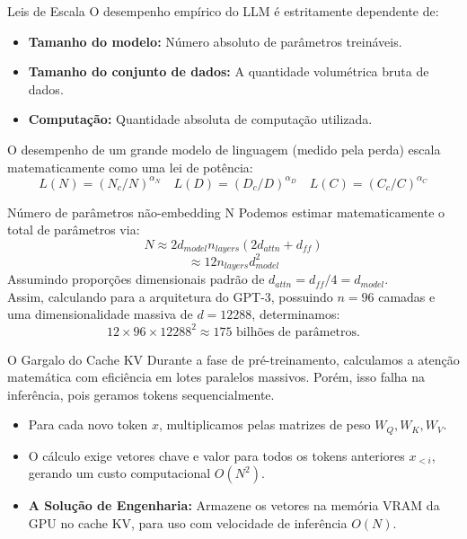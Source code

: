 \documentclass[aspectratio=169]{beamer}
\begin{document}
\begin{frame}{Leis de Escala}\justifying
    O desempenho empírico do LLM é estritamente dependente de:
    \begin{itemize}
        \item \textbf{Tamanho do modelo:} Número absoluto de parâmetros treináveis.
        \item \textbf{Tamanho do conjunto de dados:} A quantidade volumétrica bruta de dados.
        \item \textbf{Computação:} Quantidade absoluta de computação utilizada.
    \end{itemize}
    O desempenho de um grande modelo de linguagem (medido pela perda) escala matematicamente como uma lei de potência:
    \[ L(N) = (N_c/N)^{\alpha_N} \quad L(D) = (D_c/D)^{\alpha_D} \quad L(C) = (C_c/C)^{\alpha_C} \]
\end{frame}

\begin{frame}{Número de parâmetros não-embedding N}\justifying
    Podemos estimar matematicamente o total de parâmetros via:
    \[ N \approx 2 d_{model} n_{layers} (2d_{attn} + d_{ff}) \]   
    \[ \approx 12 n_{layers} d_{model}^2 \]
    Assumindo proporções dimensionais padrão de $d_{attn} = d_{ff}/4 = d_{model}$. \\
    \vspace{0.5cm}
    Assim, calculando para a arquitetura do GPT-3, possuindo $n=96$ camadas e uma dimensionalidade massiva de $d=12288$, determinamos:
    \[ 12 \times 96 \times 12288^2 \approx 175 \text{ bilhões de parâmetros.} \]
\end{frame}

\begin{frame}{O Gargalo do Cache KV}\justifying
    Durante a fase de pré-treinamento, calculamos a atenção matemática com eficiência em lotes paralelos massivos. Porém, isso falha na inferência, pois geramos tokens sequencialmente.
    \begin{itemize}
        \item Para cada novo token $x$, multiplicamos pelas matrizes de peso $W_Q, W_K, W_V$.
        \item O cálculo exige vetores chave e valor para todos os tokens anteriores $x_{<i}$, gerando um custo computacional $O(N^2)$.
        \item \textbf{A Solução de Engenharia:} Armazene os vetores na memória VRAM da GPU no cache KV, para uso com velocidade de inferência $O(N)$.
    \end{itemize}
\end{frame}
\end{document}
